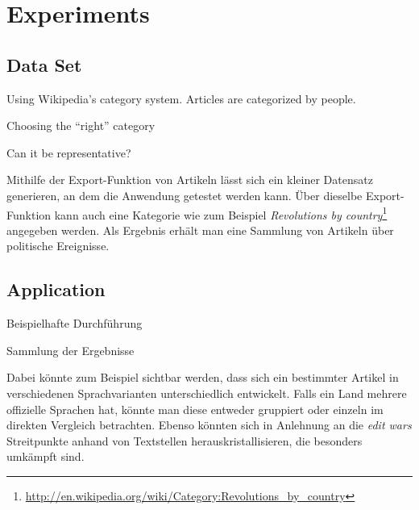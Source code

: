 \chapter{Experiments}\label{ch:experiment}

\section{Data Set}

Using Wikipedia's category system. 
Articles are categorized by people.

\begin{todos}
    \item Choosing the ``right'' category 
    \item Can it be representative?
\end{todos}

Mithilfe der Export-Funktion von Artikeln lässt sich ein kleiner Datensatz generieren, an dem die Anwendung getestet werden kann.
Über dieselbe Export-Funktion kann auch eine Kategorie wie zum Beispiel \emph{Revolutions by country}\footnote{\url{http://en.wikipedia.org/wiki/Category:Revolutions_by_country}} angegeben werden. 
Als Ergebnis erhält man eine Sammlung von Artikeln über politische Ereignisse.


\section{Application}

\begin{todos}
    \item Beispielhafte Durchführung
    \item Sammlung der Ergebnisse
\end{todos}

Dabei könnte zum Beispiel sichtbar werden, dass sich ein bestimmter Artikel in verschiedenen Sprachvarianten unterschiedlich entwickelt. 
Falls ein Land mehrere offizielle Sprachen hat, könnte man diese entweder gruppiert oder einzeln im direkten Vergleich betrachten.
Ebenso könnten sich in Anlehnung an die \emph{edit wars} Streitpunkte anhand von Textstellen herauskristallisieren, die besonders umkämpft sind. 

